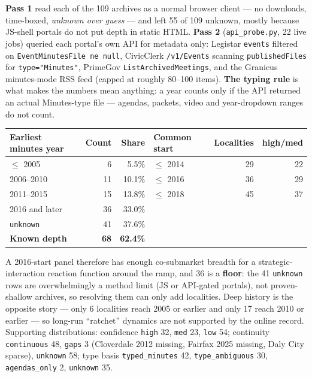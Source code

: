 \documentclass[11pt]{article}
\begin{document}
\textbf{Pass 1} read each of the 109 archives as a normal browser client --- no downloads,
time-boxed, \emph{unknown over guess} --- and left 55 of 109 unknown, mostly because JS-shell
portals do not put depth in static HTML. \textbf{Pass 2} (\texttt{api\_probe.py}, 22 live jobs)
queried each portal's own API for metadata only: Legistar \texttt{events} filtered on
\texttt{EventMinutesFile ne null}, CivicClerk \texttt{/v1/Events} scanning
\texttt{publishedFiles} for \texttt{type="Minutes"}, PrimeGov \texttt{ListArchivedMeetings}, and
the Granicus minutes-mode RSS feed (capped at roughly 80--100 items). \textbf{The typing rule} is
what makes the numbers mean anything: a year counts only if the API returned an actual
Minutes-type file --- agendas, packets, video and year-dropdown ranges do not count.

\begin{center}
\begin{tabular}{lrr@{\qquad}lrr}
\toprule
\textbf{Earliest minutes year} & \textbf{Count} & \textbf{Share} &
\textbf{Common start} & \textbf{Localities} & \textbf{high/med} \\
\midrule
$\leq$ 2005      & 6  & 5.5\%  & $\leq$ 2014 & 29 & 22 \\
2006--2010       & 11 & 10.1\% & $\leq$ 2016 & 36 & 29 \\
2011--2015       & 15 & 13.8\% & $\leq$ 2018 & 45 & 37 \\
2016 and later   & 36 & 33.0\% &             &    &    \\
\texttt{unknown} & 41 & 37.6\% &             &    &    \\
\midrule
\textbf{Known depth} & \textbf{68} & \textbf{62.4\%} & & & \\
\bottomrule
\end{tabular}
\end{center}

A 2016-start panel therefore has enough co-submarket breadth for a strategic-interaction reaction
function around the ramp, and 36 is a \textbf{floor}: the 41 \texttt{unknown} rows are
overwhelmingly a method limit (JS or API-gated portals), not proven-shallow archives, so resolving
them can only add localities. Deep history is the opposite story --- only 6 localities reach 2005
or earlier and only 17 reach 2010 or earlier --- so long-run ``ratchet'' dynamics are not
supported by the online record. Supporting distributions: confidence \texttt{high} 32,
\texttt{med} 23, \texttt{low} 54; continuity \texttt{continuous} 48, \texttt{gaps} 3 (Cloverdale
2012 missing, Fairfax 2025 missing, Daly City sparse), \texttt{unknown} 58; type basis
\texttt{typed\_minutes} 42, \texttt{type\_ambiguous} 30, \texttt{agendas\_only} 2,
\texttt{unknown} 35.
\end{document}
